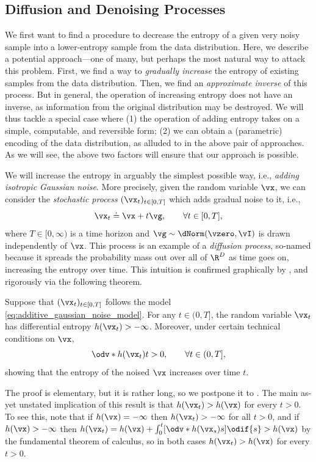 \documentclass[../../book-main.tex]{subfiles}
\begin{document}
\subsection{Diffusion and Denoising Processes} \label{sub:intro_diffusion_denoising}

We first want to find a procedure to decrease the entropy of a given very noisy sample into a lower-entropy sample from the data distribution. Here, we describe a potential approach—one of many, but perhaps the most natural way to attack this problem. First, we find a way to \textit{gradually increase} the entropy of existing samples from the data distribution. Then, we find an \textit{approximate inverse} of this process. But in general, the operation of increasing entropy does not have an inverse, as information from the original distribution may be destroyed. We will thus tackle a special case where (1) the operation of adding entropy takes on a simple, computable, and reversible form; (2) we can obtain a (parametric) encoding of the data distribution, as alluded to in the above pair of approaches. As we will see, the above two factors will ensure that our approach is possible.

We will increase the entropy in arguably the simplest possible way, i.e., \textit{adding isotropic Gaussian noise}. More precisely, given the random variable \(\vx\), we can consider the \textit{stochastic process} \((\vx_{t})_{t \in [0, T]}\) which adds gradual noise to it, i.e.,
\begin{equation}\label{eq:additive_gaussian_noise_model}
	\vx_{t} \doteq \vx + t\vg, \qquad \forall t \in [0, T],
\end{equation}
where \(T \in [0, \infty)\) is a time horizon and \(\vg \sim \dNorm(\vzero, \vI)\) is drawn independently of \(\vx\). This process is an example of a \textit{diffusion process}, so-named because it spreads the probability mass out over all of \(\R^{D}\) as time goes on, increasing the entropy over time. This intuition is confirmed graphically by , and rigorously via the following theorem.
\begin{theorem}
	Suppose that \((\vx_{t})_{t \in [0, T]}\) follows the model \eqref{eq:additive_gaussian_noise_model}. For any \(t \in (0, T]\), the random variable \(\vx_{t}\) has differential entropy \(h(\vx_{t}) > -\infty\). Moreover, under certain technical conditions on \(\vx\), 
	\begin{equation}
		\odv*{h(\vx_{t})}{t} > 0, \qquad \forall t \in (0, T],
	\end{equation}
	showing that the entropy of the noised \(\vx\) increases over time \(t\).
\end{theorem}
The proof is elementary, but it is rather long, so we postpone it to . The main as-yet unstated implication of this result is that \(h(\vx_{t}) > h(\vx)\) for every \(t > 0\). To see this, note that if \(h(\vx) = -\infty\) then \(h(\vx_{t}) > -\infty\) for all \(t > 0\),  and if \(h(\vx) > -\infty\) then \(h(\vx_{t}) = h(\vx) + \int_{0}^{t}[\odv*{h(\vx_{s})}{s}]\odif{s} > h(\vx)\) by the fundamental theorem of calculus, so in both cases \(h(\vx_{t}) > h(\vx)\) for every \(t > 0\).
\end{document}
